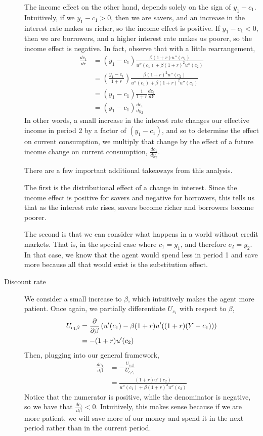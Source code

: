\begin{description}
    The income effect on the other hand, depends solely on the sign of $y_1 - c_1$. Intuitively, if we $y_1 - c_1 > 0$, then we are savers, and an increase in the interest rate makes us richer, so the income effect is positive. If $y_1 - c_1 < 0$, then we are borrowers, and a higher interest rate makes us poorer, so the income effect is negative. In fact, observe that with a little rearrangement,
    \begin{align*}
        \frac{dc_1}{dr} &= (y_1 - c_1) \frac{\beta(1 + r) u''(c_2)}{u''(c_1) + \beta (1 + r)^2 u''(c_2)} \\
        &= \left(\frac{y_1 - c_1}{1 + r}\right) \frac{\beta(1 + r)^2 u''(c_2)}{u''(c_1) + \beta (1 + r)^2 u''(c_2)} \\
        &= (y_1 - c_1) \frac{1}{1 + r} \frac{dc_1}{dY} \\
        &= (y_1 - c_1) \frac{dc_1}{dy_2}
    \end{align*}
    In other words, a small increase in the interest rate changes our effective income in period 2 by a factor of $(y_1 - c_1)$, and so to determine the effect on current consumption, we multiply that change by the effect of a future income change on current consumption, $\frac{dc_1}{dy_2}$. 
    
    There are a few important additional takeaways from this analysis. 
    
    The first is the distributional effect of a change in interest. Since the income effect is positive for savers and negative for borrowers, this tells us that as the interest rate rises, savers become richer and borrowers become poorer. 

    The second is that we can consider what happens in a world without credit markets. That is, in the special case where $c_1 = y_1$, and therefore $c_2 = y_2$. In that case, we know that the agent would spend less in period 1 and save more because all that would exist is the substitution effect. 
    
    \item[Discount rate] We consider a small increase to $\beta$, which intuitively makes the agent more patient. Once again, we partially differentiate $U_{c_1}$ with respect to $\beta$,
    \begin{align*}
        U_{c_1 \beta} &= \frac{\partial }{\partial \beta} \left(u'(c_1) - \beta (1 + r) u'((1 + r)(Y - c_1))\right) \\
        &= -(1 + r) u'(c_2)
    \end{align*} 
    Then, plugging into our general framework,
    \begin{align*}
        \frac{dc_1}{d \beta} &= - \frac{U_{c_1 \beta} }{U_{c_1 c_1}} \\
        &= \frac{(1 + r)u'(c_2)}{u''(c_1) + \beta (1+r)^2 u''(c_2)}
    \end{align*}
    Notice that the numerator is positive, while the denominator is negative, so we have that $\frac{dc_1}{d\beta} < 0$. Intuitively, this makes sense because if we are more patient, we will save more of our money and spend it in the next period rather than in the current period. 
\end{description}